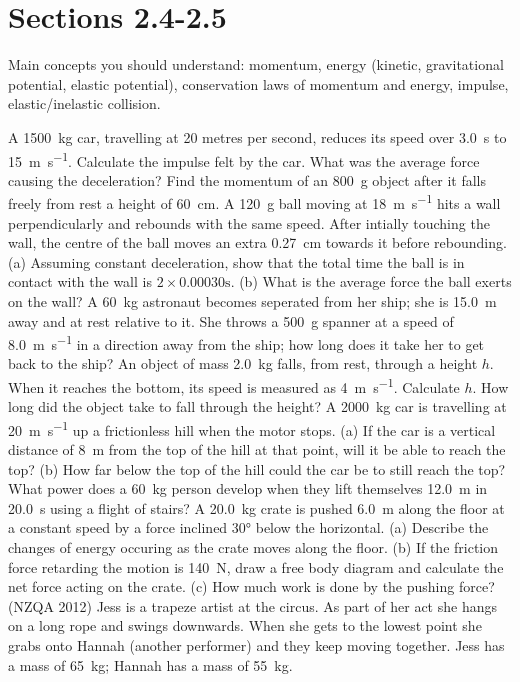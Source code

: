 \documentclass[a4paper]{exam}
\begin{document}
  \section*{Sections 2.4-2.5}
  Main concepts you should understand: momentum, energy (kinetic, gravitational potential, elastic potential), conservation laws of momentum and energy,
  impulse, elastic/inelastic collision.
  \begin{questions}
    \question A \SI{1500}{\kilo\gram} car, travelling at 20 metres per second, reduces its speed over \SI{3.0}{\second}
              to \SI{15}{\metre\per\second}. Calculate the impulse felt by the car. What was the average force causing the deceleration?
    \question Find the momentum of an \SI{800}{\gram} object after it falls freely from rest a height of \SI{60}{\centi\metre}.
    \question A \SI{120}{\gram} ball moving at \SI{18}{\metre\per\second} hits a wall perpendicularly and rebounds with the same
              speed. After intially touching the wall, the centre of the ball moves an extra \SI{0.27}{\centi\metre} towards it
              before rebounding. (a) Assuming constant deceleration, show that the total time the ball is in contact with the
              wall is $ 2 \times 0.00030 \si{\second} $. (b) What is the average force the ball exerts on the wall?
    \question A \SI{60}{\kilo\gram} astronaut becomes seperated from her ship; she is \SI{15.0}{\metre} away and at rest
              relative to it. She throws a \SI{500}{\gram} spanner at a speed of \SI{8.0}{\metre\per\second} in a direction
              away from the ship; how long does it take her to get back to the ship?
    \question An object of mass \SI{2.0}{\kilo\gram} falls, from rest, through a height $ h $. When it reaches the bottom, its
              speed is measured as \SI{4}{\metre\per\second}. Calculate $ h $. How long did the object take to fall through the height?
    \question A \SI{2000}{\kilo\gram} car is travelling at \SI{20}{\metre\per\second} up a frictionless hill when the motor stops. (a) If the car
              is a vertical distance of \SI{8}{\metre} from the top of the hill at that point, will it be able to reach the top? (b) How far below
              the top of the hill could the car be to still reach the top?
    \question What power does a \SI{60}{\kilo\gram} person develop when they lift themselves \SI{12.0}{\metre} in \SI{20.0}{\second} using
              a flight of stairs?
    \question A \SI{20.0}{\kilo\gram} crate is pushed \SI{6.0}{\metre} along the floor at a constant speed by a force
              inclined \ang{30} below the horizontal. (a) Describe the changes of energy occuring as the crate
              moves along the floor. (b) If the friction force retarding the motion is \SI{140}{\newton},
              draw a free body diagram and calculate the net force acting on the crate. (c) How much work is done by
              the pushing force?
    \question (NZQA 2012) Jess is a trapeze artist at the circus. As part of her act she hangs
              on a long rope and swings downwards. When she gets to the lowest point she grabs
              onto Hannah (another performer) and they keep moving together. Jess has a mass of \SI{65}{\kilo\gram};
              Hannah has a mass of \SI{55}{\kilo\gram}.
      \begin{parts}

\end{parts}
\end{questions}
\end{document}
